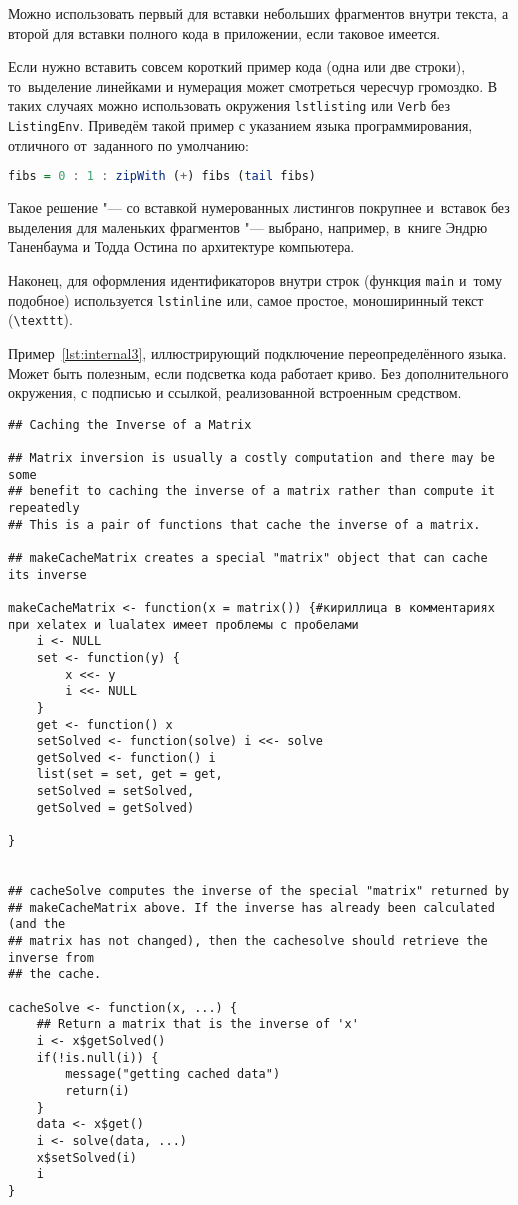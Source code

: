 Можно использовать первый для вставки небольших фрагментов
внутри текста, а второй для вставки полного
кода в приложении, если таковое имеется.

Если нужно вставить совсем короткий пример кода (одна или две строки),
то~выделение  линейками и нумерация может смотреться чересчур громоздко.
В таких случаях можно использовать окружения \texttt{lstlisting} или
\texttt{Verb} без \texttt{ListingEnv}. Приведём такой пример
с указанием языка программирования, отличного от~заданного по умолчанию:
\begin{lstlisting}[language=Haskell]
fibs = 0 : 1 : zipWith (+) fibs (tail fibs)
\end{lstlisting}
Такое решение "--- со вставкой нумерованных листингов покрупнее
и~вставок без выделения для маленьких фрагментов "--- выбрано,
например, в~книге Эндрю Таненбаума и Тодда Остина по архитектуре
компьютера.

Наконец, для оформления идентификаторов внутри строк
(функция \lstinline{main} и~тому подобное) используется
\texttt{lstinline} или, самое простое, моноширинный текст
(\texttt{\textbackslash texttt}).

Пример~\cref{lst:internal3}, иллюстрирующий подключение переопределённого
языка. Может быть полезным, если подсветка кода работает криво. Без
дополнительного окружения, с подписью и ссылкой, реализованной встроенным
средством.
\begingroup
\captiondelim{ } %
\begin{lstlisting}[language={Renhanced},caption={Пример листинга c подписью собственными средствами},label={lst:internal3}]
## Caching the Inverse of a Matrix

## Matrix inversion is usually a costly computation and there may be some
## benefit to caching the inverse of a matrix rather than compute it repeatedly
## This is a pair of functions that cache the inverse of a matrix.

## makeCacheMatrix creates a special "matrix" object that can cache its inverse

makeCacheMatrix <- function(x = matrix()) {#кириллица в комментариях при xelatex и lualatex имеет проблемы с пробелами
    i <- NULL
    set <- function(y) {
        x <<- y
        i <<- NULL
    }
    get <- function() x
    setSolved <- function(solve) i <<- solve
    getSolved <- function() i
    list(set = set, get = get,
    setSolved = setSolved,
    getSolved = getSolved)

}


## cacheSolve computes the inverse of the special "matrix" returned by
## makeCacheMatrix above. If the inverse has already been calculated (and the
## matrix has not changed), then the cachesolve should retrieve the inverse from
## the cache.

cacheSolve <- function(x, ...) {
    ## Return a matrix that is the inverse of 'x'
    i <- x$getSolved()
    if(!is.null(i)) {
        message("getting cached data")
        return(i)
    }
    data <- x$get()
    i <- solve(data, ...)
    x$setSolved(i)
    i
}
\end{lstlisting} %
\endgroup


